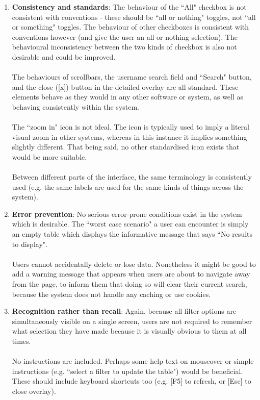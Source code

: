 \begin{enumerate}
\item \textbf{Consistency and standards}: The behaviour of the ``All" checkbox is not consistent with conventions - these should be ``all or nothing" toggles, not ``all or something" toggles. The behaviour of other checkboxes is consistent with conventions however (and give the user an all or nothing selection). The behavioural inconsistency between the two kinds of checkbox is also not desirable and could be improved. \\
\\
The behaviours of scrollbars, the username search field and ``Search" button, and the close ([x]) button in the detailed overlay are all standard. These elements behave as they would in any other software or system, as well as behaving consistently within the system. \\
\\
The ``zoom in" icon is not ideal. The icon is typically used to imply a literal visual zoom in other systems, whereas in this instance it implies something slightly different. That being said, no other standardised icon exists that would be more suitable. \\
\\
Between different parts of the interface, the same terminology is consistently used (e.g. the same labels are used for the same kinds of things across the system). 

\item \textbf{Error prevention}: No serious error-prone conditions exist in the system which is desirable. The ``worst case scenario" a user can encounter is simply an empty table which displays the informative message that says ``No results to display". \\
\\
Users cannot accidentally delete or lose data. Nonetheless it might be good to add a warning message that appears when users are about to navigate away from the page, to inform them that doing so will clear their current search, because the system does not handle any caching or use cookies. \\

\item \textbf{Recognition rather than recall}: Again, because all filter options are simultaneously visible on a single screen, users are not required to remember what selection they have made because it is visually obvious to them at all times. \\
\\
No instructions are included. Perhaps some help text on mouseover or simple instructions (e.g. ``select a filter to update the table") would be beneficial. These should include keyboard shortcuts too (e.g. [F5] to refresh, or [Esc] to close overlay).


\end{enumerate}
